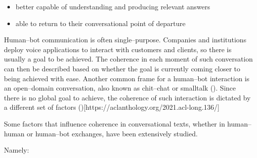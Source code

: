\documentclass[12pt]{report}
\begin{document}
\begin{itemize}
\item
   better capable of understanding and producing relevant answers

\item
   able to return to their conversational point of departure
\end{itemize}

\par
Human–bot communication is often single–purpose.
Companies and institutions deploy voice applications to interact with customers and clients,
so there is usually a goal to be achieved.
The coherence in each moment of such conversation can then be described based on whether
the goal is currently coming closer to being achieved with ease.
Another common frame for a human–bot interaction is an open–domain conversation,
also known as chit–chat or smalltalk ().
Since there is no global goal to achieve,
the coherence of such interaction is dictated by
a different set of factors ()[https://aclanthology.org/2021.acl-long.136/]

\par
Some factors that influence coherence in conversational texts,
whether in human–human or human–bot exchanges,
have been extensively studied.
\par
Namely:
\end{document}
